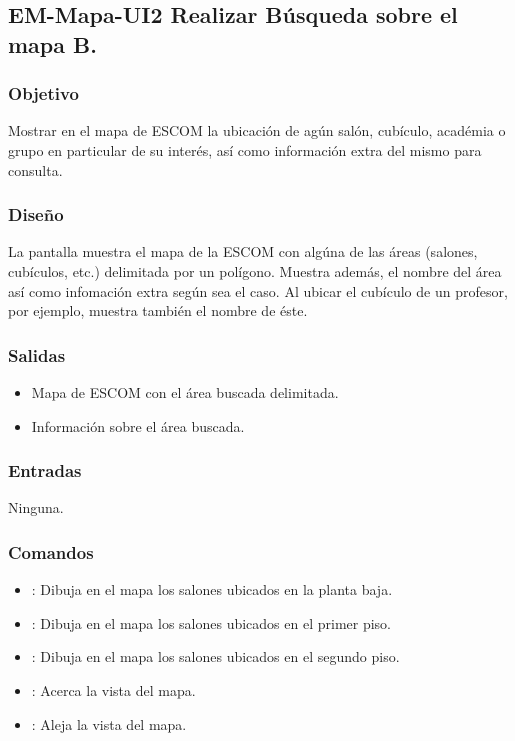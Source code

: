 
\pagebreak
\subsection{EM-Mapa-UI2 Realizar Búsqueda sobre el mapa B.}

\subsubsection{Objetivo}
	\noindent
	Mostrar en el mapa de ESCOM la ubicación de agún salón, cubículo, académia o grupo en particular de su interés,
	así como información extra del mismo para consulta.  

\subsubsection{Diseño}
	\noindent
	La pantalla muestra el mapa de la ESCOM con algúna de las áreas (salones, cubículos, etc.) delimitada por un polígono.
	Muestra además, el nombre del área así como infomación extra según sea el caso. Al ubicar el cubículo de un profesor, 
	por ejemplo, muestra también el nombre de éste. 

\pagebreak
{}

\subsubsection{Salidas}
	\begin{itemize}
		\item Mapa de ESCOM con el área buscada delimitada.
		\item Información sobre el área buscada.
	\end{itemize}

\subsubsection{Entradas}
	\noindent
	Ninguna.

\subsubsection{Comandos}
\begin{itemize}
		\item {}: Dibuja en el mapa los salones ubicados en la planta baja.
		\item {}: Dibuja en el mapa los salones ubicados en el primer piso.
		\item {}: Dibuja en el mapa los salones ubicados en el segundo piso.
		\item \IUbutton{  +  }: Acerca la vista del mapa.
		\item \IUbutton{  -  }: Aleja la vista del mapa.
\end{itemize}

